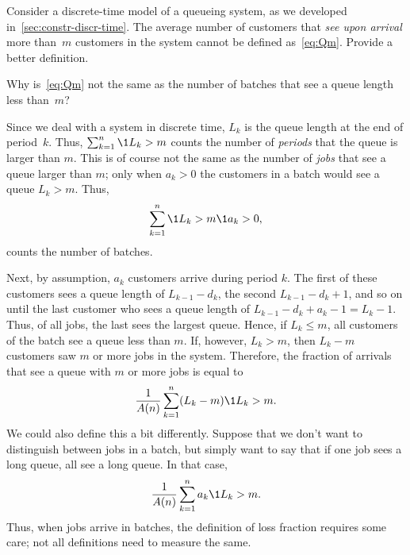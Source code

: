\begin{exercise}
 Consider a discrete-time model of a queueing system, as we developed in~\cref{sec:constr-discr-time}.
 The average number of customers that \emph{see upon arrival} more than~$m$ customers in the system cannot be defined as~\cref{eq:Qm}.
 Provide a better definition.
\begin{hint}
 Why is~\cref{eq:Qm} not the same as the number of batches that see a queue length less than~$m$?
\end{hint}
\begin{solution} Since we deal with a system in discrete time, $L_k$ is the queue length at the end of period~$k$.
 Thus, $\sum_{k=1}^n \1{L_k > m}$ counts the number of \emph{periods} that the queue is larger than $m$.
 This is of course not the same as the number of \emph{jobs} that see a queue larger than $m$; only when $a_k>0$ the customers in a batch would see a queue $L_k>m$.
 Thus,
 \begin{equation*}
 \sum_{k=1}^n \1{L_k > m} \1{a_k > 0},
 \end{equation*}
 counts the number of batches. 

 Next, by assumption, $a_k$ customers arrive during period $k$.
 The first of these customers sees a queue length of $L_{k-1} - d_k$, the second $L_{k-1}-d_k + 1$, and so on until the last customer who sees a queue length of $L_{k-1} - d_k + a_k -1 = L_k -1$.
 Thus, of all jobs, the last sees the largest queue.
 Hence, if $L_k \leq m$, all customers of the batch see a queue less than $m$.
 If, however, $L_k > m$, then $L_k -m$ customers saw $m$ or more jobs in the system.
 Therefore, the fraction of arrivals that see a queue with $m$ or more jobs is equal to
\begin{equation*}
 \frac 1 {A(n)} \sum_{k=1}^n (L_k - m) \1{L_k > m} .
\end{equation*}
We could also define this a bit differently.
Suppose that we don't want to distinguish between jobs in a batch, but simply want to say that if one job sees a long queue, all see a long queue.
In that case,
\begin{equation*}
\frac 1{A(n)}\sum_{k=1}^n a_k \1{L_k > m}.
\end{equation*}
Thus, when jobs arrive in batches, the definition of loss fraction requires some care; not all definitions need to measure the same.
\end{solution}
\end{exercise}






 



